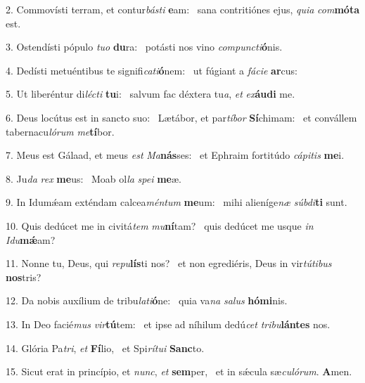 2. Commovísti terram, et contur\textit{bás}\textit{ti} \textbf{e}am: \ast\  sana contritiónes ejus, \textit{qui}\textit{a} \textit{com}\textbf{mó}\textbf{ta} est.\

3. Ostendísti pópulo \textit{tu}\textit{o} \textbf{du}ra: \ast\  potásti nos vino \textit{com}\textit{punc}\textit{ti}\textbf{ó}nis.\

4. Dedísti metuéntibus te signifi\textit{ca}\textit{ti}\textbf{ó}nem: \ast\  ut fúgiant a \textit{fá}\textit{ci}\textit{e} \textbf{ar}cus:\

5. Ut liberéntur di\textit{léc}\textit{ti} \textbf{tu}i: \ast\  salvum fac déxtera tu\textit{a}, \textit{et} \textit{ex}\textbf{áu}\textbf{di} me.\

6. Deus locútus est in sancto suo: \dag\  Lætábor, et par\textit{tí}\textit{bor} \textbf{Sí}chimam: \ast\  et convállem tabernacu\textit{ló}\textit{rum} \textit{me}\textbf{tí}bor.\

7. Meus est Gálaad, et meus \textit{est} \textit{Ma}\textbf{nás}ses: \ast\  et Ephraim fortitúdo \textit{cá}\textit{pi}\textit{tis} \textbf{me}i.\

8. Ju\textit{da} \textit{rex} \textbf{me}us: \ast\  Moab ol\textit{la} \textit{spe}\textit{i} \textbf{me}æ.\

9. In Idumǽam exténdam calcea\textit{mén}\textit{tum} \textbf{me}um: \ast\  mihi alieníge\textit{næ} \textit{súb}\textit{di}\textbf{ti} sunt.\

10. Quis dedúcet me in civitá\textit{tem} \textit{mu}\textbf{ní}tam? \ast\  quis dedúcet me usque \textit{in} \textit{I}\textit{du}\textbf{mǽ}am?\

11. Nonne tu, Deus, qui \textit{re}\textit{pu}\textbf{lís}ti nos? \ast\  et non egrediéris, Deus in vir\textit{tú}\textit{ti}\textit{bus} \textbf{nos}tris?\

12. Da nobis auxílium de tribu\textit{la}\textit{ti}\textbf{ó}ne: \ast\  quia va\textit{na} \textit{sa}\textit{lus} \textbf{hó}\textbf{mi}nis.\

13. In Deo facié\textit{mus} \textit{vir}\textbf{tú}tem: \ast\  et ipse ad níhilum dedú\textit{cet} \textit{tri}\textit{bu}\textbf{lán}\textbf{tes} nos.\

14. Glória Pa\textit{tri}, \textit{et} \textbf{Fí}lio, \ast\  et Spi\textit{rí}\textit{tu}\textit{i} \textbf{Sanc}to.\

15. Sicut erat in princípio, et \textit{nunc}, \textit{et} \textbf{sem}per, \ast\  et in sǽcula sæ\textit{cu}\textit{ló}\textit{rum}. \textbf{A}men.\

